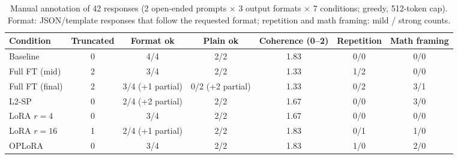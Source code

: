 \begin{table}[htbp]
\centering
\small
\caption{Manual annotation of 42 responses (2 open-ended prompts $\times$ 3 output formats $\times$ 7 conditions; greedy, 512-token cap). Format: JSON/template responses that follow the requested format; repetition and math framing: mild / strong counts.}
\label{tab:t1-annotation}
\begin{adjustbox}{max width=\linewidth}
\begin{tabular}{lcccccc}
\toprule
Condition & Truncated & Format ok & Plain ok & Coherence (0--2) & Repetition & Math framing \\
\midrule
Baseline & 0 & 4/4 & 2/2 & 1.83 & 0/0 & 0/0 \\
Full FT (mid) & 2 & 3/4 & 2/2 & 1.33 & 1/2 & 0/0 \\
Full FT (final) & 2 & 3/4 (+1 partial) & 0/2 (+2 partial) & 1.33 & 0/2 & 3/1 \\
L2-SP & 0 & 2/4 (+2 partial) & 2/2 & 1.67 & 0/0 & 3/0 \\
LoRA $r{=}4$ & 0 & 3/4 & 2/2 & 1.67 & 0/0 & 0/0 \\
LoRA $r{=}16$ & 1 & 2/4 (+1 partial) & 2/2 & 1.83 & 0/1 & 1/0 \\
OPLoRA & 0 & 3/4 & 2/2 & 1.83 & 1/0 & 2/0 \\
\bottomrule
\end{tabular}
\end{adjustbox}
\end{table}
